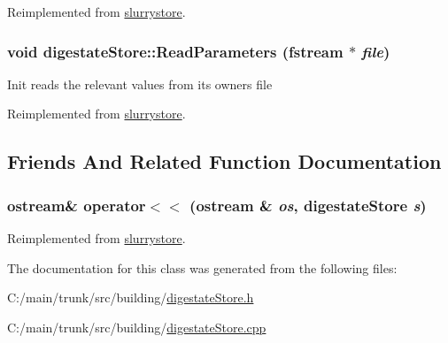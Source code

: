 Reimplemented from \hyperlink{classslurrystore_af99a5bbcf35c6845fcf989809c5347fa}{slurrystore}.\hypertarget{classdigestate_store_a93cdf55c94956f5e817ad386ea0c2a4b}{
\subsubsection[{ReadParameters}]{\setlength{\rightskip}{0pt plus 5cm}void digestateStore::ReadParameters (fstream $\ast$ {\em file})}}
\label{classdigestate_store_a93cdf55c94956f5e817ad386ea0c2a4b}
Init reads the relevant values from its owners file 

Reimplemented from \hyperlink{classslurrystore_a20975780b58214d7a091cbc2573c910c}{slurrystore}.

\subsection{Friends And Related Function Documentation}
\hypertarget{classdigestate_store_afe43a1f833661ff0491a2b3f4a2a0c24}{
\subsubsection[{operator$<$$<$}]{\setlength{\rightskip}{0pt plus 5cm}ostream\& operator$<$$<$ (ostream \& {\em os}, \/  {\bf digestateStore} {\em s})}}
\label{classdigestate_store_afe43a1f833661ff0491a2b3f4a2a0c24}


Reimplemented from \hyperlink{classslurrystore_a74247370258ba08c974e190aca4ed0a5}{slurrystore}.

The documentation for this class was generated from the following files:\begin{DoxyCompactItemize}
\item 
C:/main/trunk/src/building/\hyperlink{digestate_store_8h}{digestateStore.h}\item 
C:/main/trunk/src/building/\hyperlink{digestate_store_8cpp}{digestateStore.cpp}\end{DoxyCompactItemize}
